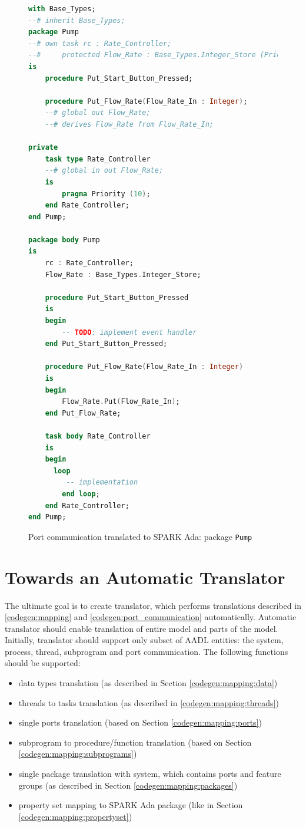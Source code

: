 \begin{figure}
\singlespacing
\begin{lstlisting}[language=ada, frame=single, gobble=0]
with Base_Types;
--# inherit Base_Types;
package Pump
--# own task rc : Rate_Controller;
--#     protected Flow_Rate : Base_Types.Integer_Store (Priority => 10);
is
    procedure Put_Start_Button_Pressed;

    procedure Put_Flow_Rate(Flow_Rate_In : Integer);
    --# global out Flow_Rate;
    --# derives Flow_Rate from Flow_Rate_In;

private
    task type Rate_Controller
    --# global in out Flow_Rate;
    is
        pragma Priority (10);
    end Rate_Controller;
end Pump;

package body Pump
is
    rc : Rate_Controller;
    Flow_Rate : Base_Types.Integer_Store;

    procedure Put_Start_Button_Pressed
    is
    begin
        -- TODO: implement event handler
    end Put_Start_Button_Pressed;

    procedure Put_Flow_Rate(Flow_Rate_In : Integer)
    is
    begin
        Flow_Rate.Put(Flow_Rate_In);
    end Put_Flow_Rate;

    task body Rate_Controller
    is
    begin
      loop
         -- implementation
        end loop;
    end Rate_Controller;
end Pump;
\end{lstlisting} 
\doublespacing
\caption{Port communication translated to SPARK Ada: package \lstinline{Pump}}
\label{listing:port_communication_spark_pump}
\end{figure}


\section{Towards an Automatic Translator}
\label{codegen:translator}

The ultimate goal is to create translator, which performs translations described in \ref{codegen:mapping} and \ref{codegen:port_communication} automatically. Automatic translator should enable translation of entire model and parts of the model. Initially, translator should support only subset of AADL entities: the system, process, thread, subprogram and port communication. The following functions should be supported:
\begin{itemize}
	\item data types translation (as described in Section \ref{codegen:mapping:data})
	\item threads to tasks translation (as described in \ref{codegen:mapping:threads})
	\item single ports translation (based on Section \ref{codegen:mapping:ports})
	\item subprogram to procedure/function translation (based on Section \ref{codegen:mapping:subprograms})
	\item single package translation with system, which contains ports and feature groups (as described in Section \ref{codegen:mapping:packages})
	\item property set mapping to SPARK Ada package (like in Section \ref{codegen:mapping:propertyset})
\end{itemize}

